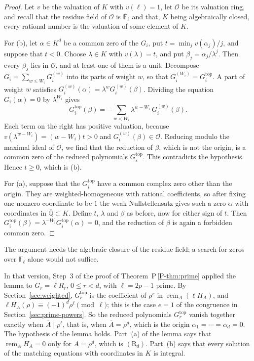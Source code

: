 \documentclass[11pt]{article}
\newcommand{\QQ}{\mathbb Q}
\newcommand{\FF}{\mathbb F}
\newcommand{\remA}{\operatorname{rem}_{A}}
\numberwithin{equation}{section}
\begin{document}
\begin{proof}
Let \(v\) be the valuation of \(K\) with \(v(\ell)=1\), let
\(\mathcal O\) be its valuation ring, and recall that the residue field
of \(\mathcal O\) is \(\overline{\FF}_\ell\) and that, \(K\) being
algebraically closed, every rational number is the valuation of some
element of \(K\).

For (b), let \(\alpha\in K^d\) be a common zero of the \(G_i\), put
\(t=\min_j v(\alpha_j)/j\), and suppose that \(t<0\). Choose
\(\lambda\in K\) with \(v(\lambda)=t\), and put
\(\beta_j=\alpha_j/\lambda^j\). Then every \(\beta_j\) lies in
\(\mathcal O\), and at least one of them is a unit. Decompose
\(G_i=\sum_{w\le W_i}G_i^{(w)}\) into its parts of weight \(w\), so that
\(G_i^{(W_i)}=G_i^{\mathrm{top}}\). A part of weight \(w\) satisfies
\(G_i^{(w)}(\alpha)=\lambda^wG_i^{(w)}(\beta)\). Dividing the equation
\(G_i(\alpha)=0\) by \(\lambda^{W_i}\) gives
\[
 G_i^{\mathrm{top}}(\beta)
 =-\sum_{w<W_i}\lambda^{w-W_i}\,G_i^{(w)}(\beta).
\]
Each term on the right has positive valuation, because
\(v(\lambda^{w-W_i})=(w-W_i)t>0\) and \(G_i^{(w)}(\beta)\in\mathcal O\).
Reducing modulo the maximal ideal of \(\mathcal O\), we find that the
reduction of \(\beta\), which is not the origin, is a common zero of the
reduced polynomials \(G_i^{\mathrm{top}}\). This contradicts the
hypothesis. Hence \(t\ge0\), which is (b).

For (a), suppose that the \(G_i^{\mathrm{top}}\) have a common complex
zero other than the origin. They are weighted-homogeneous with rational
coefficients, so after fixing one nonzero coordinate to be \(1\) the
weak Nullstellensatz gives such a zero \(\alpha\) with coordinates in
\(\overline{\QQ}\subset K\). Define \(t\), \(\lambda\) and \(\beta\) as
before, now for either sign of \(t\). Then
\(G_i^{\mathrm{top}}(\beta)=\lambda^{-W_i}G_i^{\mathrm{top}}(\alpha)=0\),
and the reduction of \(\beta\) is again a forbidden common zero.
\end{proof}

The argument needs the algebraic closure of the residue field; a search
for zeros over \(\FF_\ell\) alone would not suffice.

In that version, Step~3 of the proof of
Theorem~P\,\ref{P-thm:prime} applied the lemma to \(G_r=\ell R_r\),
\(0\le r<d\), with \(\ell=2p-1\) prime. By
Section~\ref{sec:weighted}, \(G_r^{\mathrm{top}}\) is the coefficient
of \(\rho^r\) in \(\remA(\ell H_A)\), and
\(\ell H_A(\rho)\equiv(-1)^d\rho^\ell\pmod\ell\); this is the case
\(e=1\) of the congruence in Section~\ref{sec:prime-powers}. So the
reduced polynomials \(G_r^{\mathrm{top}}\) vanish together exactly when
\(\overline A\mid\rho^\ell\), that is, when \(\overline A=\rho^d\),
which is the origin \(\alpha_1=\cdots=\alpha_d=0\). The hypothesis of
the lemma holds. Part~(a) of the lemma says that \(\remA H_A=0\) only
for \(A=\rho^d\), which is \((\mathrm R_d)\). Part~(b) says that every
solution of the matching equations with coordinates in \(K\) is
integral.
\end{document}
